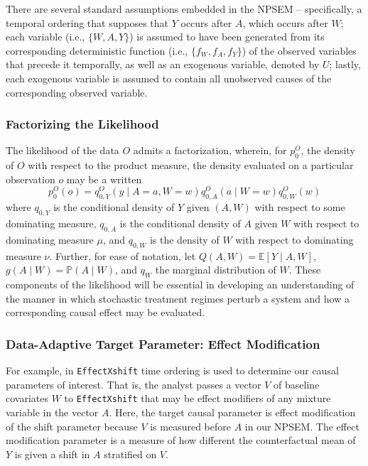 \documentclass[
]{article}
\begin{document}
There are several standard assumptions embedded in the NPSEM --
specifically, a temporal ordering that supposes that \(Y\) occurs after
\(A\), which occurs after \(W\); each variable (i.e., \(\{W, A, Y\}\))
is assumed to have been generated from its corresponding deterministic
function (i.e., \(\{f_W, f_A, f_Y\}\)) of the observed variables that
precede it temporally, as well as an exogenous variable, denoted by
\(U\); lastly, each exogenous variable is assumed to contain all
unobserved causes of the corresponding observed variable.

\hypertarget{factorizing-the-likelihood}{%
\subsubsection{Factorizing the
Likelihood}\label{factorizing-the-likelihood}}

The likelihood of the data \(O\) admits a factorization, wherein, for
\(p_0^O\), the density of \(O\) with respect to the product measure, the
density evaluated on a particular observation \(o\) may be a written
\begin{equation}
  p_0^O(o) = q^O_{0,Y}(y \mid A = a, W = w) q^O_{0,A}(a \mid W = w)
  q^O_{0,W}(w)
\end{equation} where \(q_{0, Y}\) is the conditional density of \(Y\)
given \((A, W)\) with respect to some dominating measure, \(q_{0, A}\)
is the conditional density of \(A\) given \(W\) with respect to
dominating measure \(\mu\), and \(q_{0, W}\) is the density of \(W\)
with respect to dominating measure \(\nu\). Further, for ease of
notation, let \(Q(A, W) = \mathbb{E}[Y \mid A, W]\),
\(g(A \mid W) = \mathbb{P}(A \mid W)\), and \(q_W\) the marginal
distribution of \(W\). These components of the likelihood will be
essential in developing an understanding of the manner in which
stochastic treatment regimes perturb a system and how a corresponding
causal effect may be evaluated.

\hypertarget{data-adaptive-target-parameter-effect-modification}{%
\subsubsection{Data-Adaptive Target Parameter: Effect
Modification}\label{data-adaptive-target-parameter-effect-modification}}

For example, in \texttt{EffectXshift} time ordering is used to determine
our causal parameters of interest. That is, the analyst passes a vector
\(V\) of baseline covariates \(W\) to \texttt{EffectXshift} that may be
effect modifiers of any mixture variable in the vector \(A\). Here, the
target causal parameter is effect modification of the shift parameter
because \(V\) is measured before \(A\) in our NPSEM. The effect
modification parameter is a measure of how different the counterfactual
mean of \(Y\) is given a shift in \(A\) stratified on \(V\).
\end{document}
